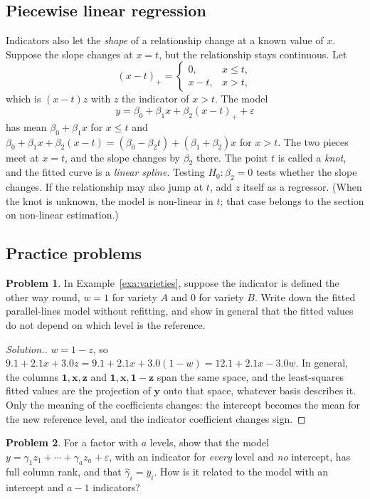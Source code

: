 \documentclass[11pt,a4paper]{article}
\numberwithin{equation}{section}
\theoremstyle{definition}
\newtheorem{problemx}{Problem}[subsection]
\newenvironment{problem}{\begin{problemx}}{\end{problemx}}
\newenvironment{solution}
  {\renewcommand{\qedsymbol}{}\begin{proof}[\textit{Solution}.]}
  {\end{proof}}
\begin{document}
\subsection{Piecewise linear regression}
Indicators also let the \emph{shape} of a relationship change at a known value of $x$. Suppose the slope
changes at $x = t$, but the relationship stays continuous. Let
\[
(x - t)_+ = \begin{cases} 0 , & x \le t , \\ x - t , & x > t , \end{cases}
\]
which is $(x - t)z$ with $z$ the indicator of $x > t$. The model
\[
y = \beta_0 + \beta_1x + \beta_2(x - t)_+ + \varepsilon
\]
has mean $\beta_0 + \beta_1x$ for $x \le t$ and $\beta_0 + \beta_1x + \beta_2(x - t) = (\beta_0 - \beta_2t) + (\beta_1 + \beta_2)x$ for $x > t$. The
two pieces meet at $x = t$, and the slope changes by $\beta_2$ there. The point $t$ is called a \emph{knot}, and the
fitted curve is a \emph{linear spline}. Testing $H_0\colon \beta_2 = 0$ tests whether the slope changes. If the
relationship may also jump at $t$, add $z$ itself as a regressor. (When the knot is unknown, the model is
non-linear in $t$; that case belongs to the section on non-linear estimation.)

\subsection{Practice problems}
\begin{problem}\label{prob:recode}
In Example~\ref{exa:varieties}, suppose the indicator is defined the other way round, $w = 1$ for variety $A$ and
$0$ for variety $B$. Write down the fitted parallel-lines model without refitting, and show in general that
the fitted values do not depend on which level is the reference.
\end{problem}

\begin{solution}
$w = 1 - z$, so $9.1 + 2.1x + 3.0z = 9.1 + 2.1x + 3.0(1 - w) = 12.1 + 2.1x - 3.0w$. In general, the columns
$\mathbf{1}, \mathbf{x}, \mathbf{z}$ and $\mathbf{1}, \mathbf{x}, \mathbf{1} - \mathbf{z}$ span the same space, and the least-squares fitted
values are the projection of $\mathbf{y}$ onto that space, whatever basis describes it. Only the meaning of the
coefficients changes: the intercept becomes the mean for the new reference level, and the indicator
coefficient changes sign.
\end{solution}

\begin{problem}\label{prob:cell-means}
For a factor with $a$ levels, show that the model $y = \gamma_1z_1 + \cdots + \gamma_az_a + \varepsilon$, with an indicator for
\emph{every} level and \emph{no} intercept, has full column rank, and that $\hat\gamma_i = \bar y_i$. How is it related to
the model with an intercept and $a - 1$ indicators?
\end{problem}
\end{document}
